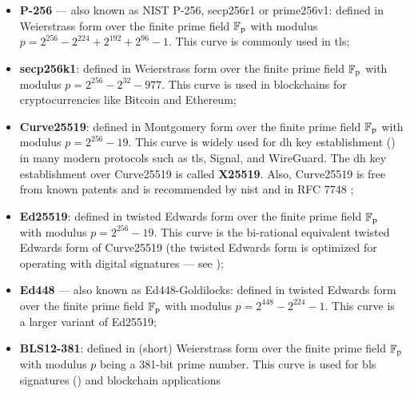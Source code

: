 \begin{itemize}
	\item \textbf{P-256} --- also known as NIST P-256, secp256r1 or prime256v1: defined in Weierstrass form over the finite prime field $\mathbb{F}\textsubscript{p}$ with modulus $p = 2^{256} - 2^{224} + 2^{192} + 2^{96} - 1$. This curve is commonly used in \gls{tls};
	\item \textbf{secp256k1}: defined in Weierstrass form over the finite prime field $\mathbb{F}\textsubscript{p}$ with modulus $p = 2^{256} - 2^{32} - 977$. This curve is used in blockchains for cryptocurrencies like Bitcoin and Ethereum;
	\item \textbf{Curve25519}: defined in Montgomery form over the finite prime field $\mathbb{F}\textsubscript{p}$ with modulus $p = 2^{256} - 19$. This curve is widely used for \gls{dh} key establishment () in many modern protocols such as \gls{tls}, Signal, and WireGuard.
	The \gls{dh} key establishment over Curve25519 is called \textbf{X25519}. Also, Curve25519 is free from known patents and is recommended by \gls{nist} \cite{chen_recommendations_2023} and in RFC 7748 \cite{rfc7748};
	\item \textbf{Ed25519}: defined in twisted Edwards form over the finite prime field $\mathbb{F}\textsubscript{p}$ with modulus $p = 2^{256} - 19$. This curve is the bi-rational equivalent twisted Edwards form of Curve25519 (the twisted Edwards form is optimized for operating with digital signatures --- see );
	\item \textbf{Ed448} --- also known as Ed448-Goldilocks: defined in twisted Edwards form over the finite prime field $\mathbb{F}\textsubscript{p}$ with modulus $p = 2^{448} - 2^{224} - 1$. This curve is a larger variant of Ed25519;
	\item \textbf{BLS12-381}: defined in (short) Weierstrass form over the finite prime field $\mathbb{F}\textsubscript{p}$ with modulus $p$ being a 381-bit prime number. This curve is used for \gls{bls} signatures () and blockchain applications

\end{itemize}
